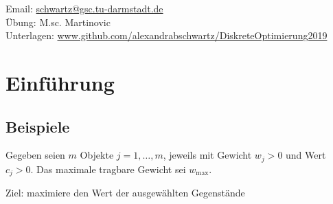 
Email: \url{schwartz@gsc.tu-darmstadt.de}\\
Übung: M.sc. Martinovic\\
Unterlagen: \url{www.github.com/alexandrabschwartz/DiskreteOptimierung2019}

\section{Einführung}
\subsection{Beispiele}
\begin{beispiel}[Rucksackproblem]\enter
	Gegeben seien $m$ Objekte $j=1,\dots,m$, jeweils mit Gewicht $w_{j}>0$ und Wert $c_{j}>0$. Das maximale tragbare Gewicht sei $w_{\max}$.

	Ziel: maximiere den Wert der ausgewählten Gegenstände
\end{beispiel}

